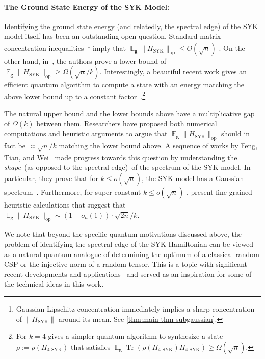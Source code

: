 \documentclass
[11pt,letterpaper]
{article}
\theoremstyle{definition}
\newcommand{\Tr}{\operatorname{Tr}}
\newcommand{\1}{\mathbf{1}}
\DeclareMathOperator*{\E}{\mathbb{E}}
\renewcommand{\geq}{\geqslant}
\renewcommand{\leq}{\leqslant}
\newcommand{\syk}{\operatorname{SYK}}
\begin{document}
\paragraph{The Ground State Energy of the SYK Model:} Identifying the ground state energy (and relatedly, the spectral edge) of the SYK model itself has been an outstanding open question. Standard matrix concentration inequalities~\footnote{Gaussian Lipschitz concentration immediately implies a sharp concentration of $\|H_{\syk}\|$ around its mean. See \cref{thm:main-thm-subgaussian}.} imply that $\E_{\bm g}\|H_{\operatorname{SYK}}\|_{\operatorname{op}}\leq O(\sqrt{n})$ \cite{feng2019spectrum,hastings2022optimizing}. On the other hand, in~\cite{anschuetzStronglyInteractingFermions2025}, the authors prove a lower bound of $\E_{\bm g}\|H_{\operatorname{SYK}}\|_{\operatorname{op}} \geq \Omega(\sqrt{n}/k)$. Interestingly, a beautiful recent work gives an efficient quantum algorithm to compute a state with an energy matching the above lower bound up to a constant factor~\cite{basso2024optimizing}.\footnote{ \label{footnote:HO-eff-quant} For $k = 4$ \cite{hastings2022optimizing} gives a simpler quantum algorithm to synthesize a state $\rho:= \rho(H_{\operatorname{4-SYK}})$ that satisfies $\E_{\bm g}\Tr(\rho(H_{\operatorname{4-SYK}})H_{\operatorname{4-SYK}})\geq\Omega(\sqrt n)$.}


The natural upper bound and the lower bounds above have a multiplicative gap of $\Omega(k)$ between them. Researchers have proposed both numerical computations and heuristic arguments to argue that $\E_{\bm g}\|H_{\operatorname{SYK}}\|_{\operatorname{op}}$ should in fact be $\asymp \sqrt{n}/k$ \cite{SYK_Garcia3,hastings2022optimizing} matching the lower bound above. A sequence of works by Feng, Tian, and Wei~\cite{feng2019spectrum,feng2020spectrum,feng2021spectrum} made progress towards this question by understanding the \emph{shape}~(as opposed to the spectral edge)~of the spectrum of the SYK model. In particular, they prove that for $k\leq o(\sqrt{n})$, the SYK model has a Gaussian spectrum~\cite{feng2019spectrum}. Furthermore, for super-constant $k\leq o(\sqrt{n})$ \cite{SYK_Garcia3}, \cite[Section~2.9]{hastings2022optimizing} present fine-grained heuristic calculations that suggest that $\E_{\bm g}\|H_{\operatorname{SYK}}\|_{\operatorname{op}} \sim (1 - o_n(1))\cdot\sqrt{2n}/k$. 

We note that beyond the specific quantum motivations discussed above, the problem of identifying the spectral edge of the SYK Hamiltonian can be viewed as a natural quantum analogue of determining the optimum of a classical random CSP or the injective norm of a random tensor. This is a topic with significant recent developments and applications~\cite{Feige02,WeinEAM25,GuruswamiKM22,HsiehKM23} and served as an inspiration for some of the technical ideas in this work.   
\end{document}
